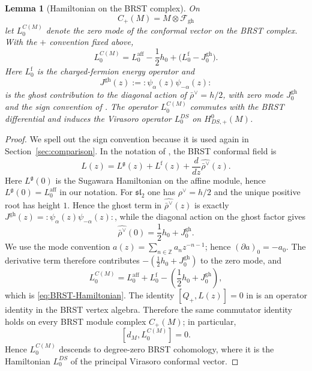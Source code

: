 \documentclass[12pt,leqno]{amsart}
\numberwithin{equation}{section}
\newtheorem{lem}[thm]{Lemma}
\def\Z{\mathbb{Z}}
\begin{document}
\begin{lem}[Hamiltonian on the BRST complex]\label{lem:BRST-Hamiltonian}
On
\[
 C_+(M)=M\otimes\mathcal F_{\mathrm{gh}}
\]
let $L^{C(M)}_0$ denote the zero mode of the conformal vector on the BRST
complex.  With the $+$ convention fixed above,
\begin{equation}\label{eq:BRST-Hamiltonian}
 L^{C(M)}_0=
 L^{\mathrm{aff}}_0-\frac12h_0+
 \bigl(L^{\mathrm f}_0-J^{\mathrm{gh}}_0\bigr).
\end{equation}
Here $L^{\mathrm f}_0$ is the charged-fermion energy operator and
\[
 J^{\mathrm{gh}}(z):=:\psi_\alpha(z)\psi_{-\alpha}(z):
\]
is the ghost contribution to the diagonal action of
$\bar\rho^\vee=h/2$, with zero mode $J^{\mathrm{gh}}_0$ and the sign
convention of \cite[Section~4.17]{ArakawaW}.  The operator
$L^{C(M)}_0$ commutes with the BRST differential and induces the Virasoro
operator $L^{DS}_0$ on $H^0_{DS,+}(M)$.
\end{lem}

\begin{proof}
We spell out the sign convention because it is used again in
Section~\ref{sec:comparison}.  In the notation of
\cite[Section~4.17]{ArakawaW}, the BRST conformal field is
\[
 L(z)=L^{\mathfrak g}(z)+L^{\mathrm f}(z)
      +\frac{d}{dz}\widehat{\bar\rho^\vee}(z).
\]
Here $L^{\mathfrak g}(0)$ is the Sugawara Hamiltonian on the affine
module, hence $L^{\mathfrak g}(0)=L^{\mathrm{aff}}_0$ in our notation.
For $\mathfrak{sl}_2$ one has $\rho^\vee=h/2$ and the unique positive root has height $1$.  Hence the ghost term in $\widehat{\bar\rho^\vee}(z)$ is exactly $J^{\mathrm{gh}}(z)=:\psi_\alpha(z)\psi_{-\alpha}(z):$, while the diagonal
action on the ghost factor gives
\begin{equation}\label{eq:diagonal-rho-action}
 \widehat{\bar\rho^\vee}(0)=\frac12h_0+J^{\mathrm{gh}}_0.
\end{equation}
We use the mode convention $a(z)=\sum_{n\in\Z}a_nz^{-n-1}$; hence
$(\partial a)_0=-a_0$.  The derivative term therefore contributes
$-(\frac12h_0+J^{\mathrm{gh}}_0)$ to the zero mode, and
\[
 L^{C(M)}_0
 =L^{\mathrm{aff}}_0+L^{\mathrm f}_0
   -\left(\frac12h_0+J^{\mathrm{gh}}_0\right),
\]
which is \eqref{eq:BRST-Hamiltonian}.  The identity $[Q_+,L(z)]=0$ in
\cite[Section~4.17]{ArakawaW} is an operator identity in the BRST vertex
algebra.  Therefore the same commutator identity holds on every BRST module
complex $C_+(M)$; in particular,
\[
 [d_M,L^{C(M)}_0]=0.
\]
Hence $L^{C(M)}_0$ descends to degree-zero BRST cohomology, where it is the
Hamiltonian $L^{DS}_0$ of the principal Virasoro conformal vector.
\end{proof}
\end{document}
